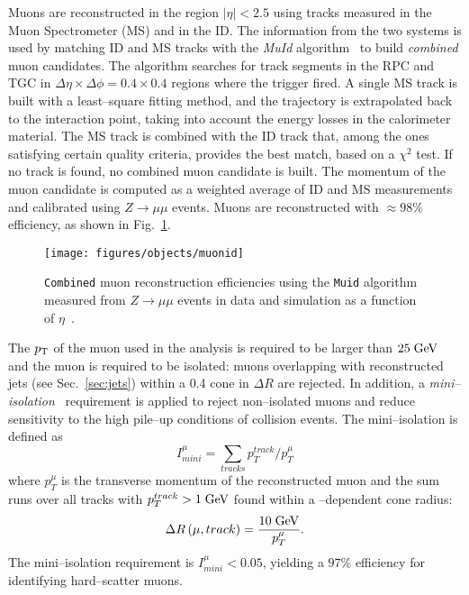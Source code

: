 Muons are reconstructed in the region $|\eta|<2.5$ using tracks
measured in the Muon Spectrometer (MS) and in the ID.
The information from the two systems is used by matching ID and MS
tracks with the {\it MuId} algorithm~\cite{muidalgo} to build 
{\it combined} muon candidates.
The algorithm searches for track segments in the RPC and TGC in
$\Delta\eta\times\Delta\phi=0.4\times0.4$ regions where the trigger
fired. A single MS track is built with a least--square fitting method, and
the trajectory is extrapolated back to the interaction point, taking
into account the energy losses in the calorimeter material. 
The MS track is combined with the ID track that, among the ones
satisfying certain quality criteria, provides the best match, based on a
$\chi^2$ test. If no track is found, no combined muon candidate is built.
The momentum of the muon candidate is computed as a weighted average
of ID and MS measurements and calibrated using $Z\to \mu\mu$ events.
Muons are reconstructed with \mbox{$\approx{}98\%$} efficiency, as shown in
Fig.~\ref{fig:mueff}.

\begin{figure}[htb!]\centering
  \texttt{[image: figures/objects/muonid]}
  \caption{\texttt{Combined} muon reconstruction efficiencies using
    the \texttt{Muid} algorithm measured from $Z\to \mu\mu$ events in
    data and simulation as a function of
    $\eta$~\cite{miniisolation}.} 
  \label{fig:mueff}
\end{figure}

The $p_{\mathrm{T}}$ of the muon used in the analysis is required to be larger
than \mbox{$25 \; \mathrm{GeV}{}$} and the muon is required to be isolated: muons
overlapping with reconstructed jets (see Sec.~\ref{sec:jets})
within a 0.4 cone in $\Delta R$ are rejected. In addition, a {\it
  mini--isolation}~\cite{miniisolation} requirement is applied to
reject non--isolated muons and reduce sensitivity to the high pile--up
conditions of \eighttev{} collision events. The mini--isolation is
defined as
\begin{equation}
I^{\mu}_{mini}=\sum_{tracks}p_T^{track}/p_T^{\mu}
\end{equation}
where $p_T^{\mu}$ is the transverse momentum of the reconstructed muon
and the sum runs over all tracks with $p_T^{track}>1\; \mathrm{GeV}$ found within a \pt{}--dependent cone
radius:
\begin{equation}
\Delta{}R\left(\mu, track\right)=\frac{10\; \mathrm{GeV}}{p_T^{\mu}}.
\end{equation}
The mini--isolation requirement is $I^{\mu}_{mini}<0.05$, yielding
a $97\%$ efficiency for identifying hard--scatter muons.

